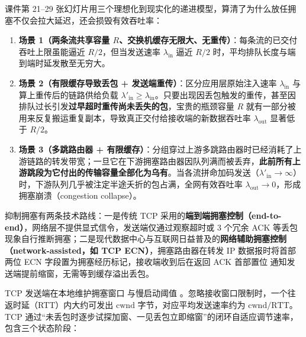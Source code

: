 课件第 21–29 张幻灯片用三个理想化到现实化的递进模型，算清了为什么放任拥塞不仅会拉大延迟，还会损毁有效吞吐率：
\begin{enumerate}
\item \textbf{场景 1（两条流共享容量 $R$、交换机缓存无限大、无重传）}：每条流的已交付吞吐上限虽能逼近 $R/2$，但当发送速率 $\lambda_{\mathrm{in}}$ 逼近 $R/2$ 时，平均排队长度与端到端时延发散至无穷大。
\item \textbf{场景 2（有限缓存导致丢包 + 发送端重传）}：区分应用层原始注入速率 $\lambda_{\mathrm{in}}$ 与算上重传后的链路供给负载 $\lambda'_{\mathrm{in}} \ge \lambda_{\mathrm{in}}$。只要出现因丢包触发的重传，甚至因排队过长引发\textbf{过早超时重传尚未丢失的包}，宝贵的瓶颈容量 $R$ 就有一部分被用来反复搬运重复副本，导致真正交付给接收端的新数据吞吐率 $\lambda_{\mathrm{out}}$ 显著低于 $R/2$。
\item \textbf{场景 3（多跳路由器 + 有限缓存）}：分组穿过上游多跳路由器时已经消耗了上游链路的转发带宽；一旦它在下游拥塞路由器因队列满而被丢弃，\textbf{此前所有上游跳段为它付出的传输容量全部化为乌有}。当各流拼命加码发送（$\lambda'_{\mathrm{in}}\to\infty$）时，下游队列几乎被注定半途夭折的包占满，全网有效吞吐率 $\lambda_{\mathrm{out}} \to 0$，形成拥塞崩溃（congestion collapse）。
\end{enumerate}

抑制拥塞有两条技术路线：一是传统 TCP 采用的\textbf{端到端拥塞控制（end-to-end）}，网络层不提供显式信令，发送端仅通过观察超时或 3 个冗余 ACK 等丢包现象自行推断拥塞；二是现代数据中心与互联网日益普及的\textbf{网络辅助拥塞控制（network-assisted，如 TCP ECN）}，拥塞路由器在转发 IP 数据报时将首部两位 ECN 字段置为拥塞经历标记，接收端收到后在返回 ACK 首部置位  通知发送端提前缩窗，无需等到缓存溢出丢包。



TCP 发送端在本地维护拥塞窗口  与慢启动阈值 。忽略接收窗口限制时，一个往返时延（RTT）内大约可发出 $\mathrm{cwnd}$ 字节，对应平均发送速率约为 $\mathrm{cwnd}/\mathrm{RTT}$。TCP 通过“未丢包时逐步试探加窗、一见丢包立即缩窗”的闭环自适应调节速率，包含三个状态阶段：

